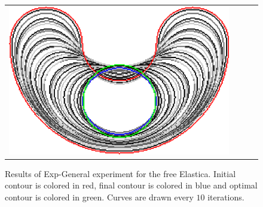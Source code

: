 \begin{figure}
\begin{tabular}{cccc}
\includegraphics[scale=0.2]{figures/chapter9/free-elastica/graphflow/bean/len_pen-0.01/radius-7/summary.pdf} 
\end{tabular}
\caption{Results of Exp-General experiment for the free Elastica. Initial contour is colored in red, final contour is colored in blue and optimal contour is colored in green. Curves are drawn every $10$ iterations.}
\label{fig:results-free-elastica-general}
\end{figure}

